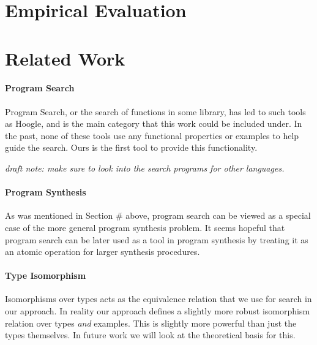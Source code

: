 \documentclass[acmsmall,review,authorversion]{acmart}
\newcommand{\?}{\stackrel{?}{\approx}}
\begin{document}
\section{Empirical Evaluation}


\section{Related Work}


\paragraph{Program Search} Program Search, or the search of functions in some
library, has led to such tools as Hoogle, and is the main category that this
work could be included under. In the past, none of these tools use any
functional properties or examples to help guide the search. Ours is the first
tool to provide this functionality.

\textit{draft note: make sure to look into the search programs for other languages.}

\paragraph{Program Synthesis} As was mentioned in Section \# above, program
search can be viewed as a special case of the more general program synthesis
problem. It seems hopeful that program search can be later used as a tool in
program synthesis by treating it as an atomic operation for larger synthesis
procedures. 

\paragraph{Type Isomorphism} Isomorphisms over types acts as the equivalence
relation that we use for search in our approach. In reality our approach defines
a slightly more robust isomorphism relation over types \textit{and} examples.
This is slightly more powerful than just the types themselves. In future work we
will look at the theoretical basis for this.
\end{document}
